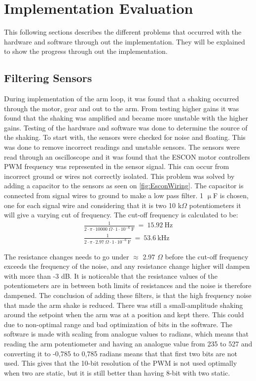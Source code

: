 \section{Implementation Evaluation}
This following sections describes the different problems that occurred with the hardware and software through out the implementation. They will be explained to show the progress through out the implementation.

\subsection{Filtering Sensors}
During implementation of the arm loop, it was found that a shaking occurred through the motor, gear and out to the arm. From testing higher gains it was found that the shaking was amplified and became more unstable with the higher gains. Testing of the hardware and software was done to determine the source of the shaking. To start with, the sensors were checked for noise and floating. This was done to remove incorrect readings and unstable sensors. The sensors were read through an oscilloscope and it was found that the ESCON motor controllers PWM frequency was represented in the sensor signal. This can occur from incorrect ground or wires not correctly isolated. This problem was solved by adding a capacitor to the sensors as seen on \autoref{fig:EsconWiring}. The capacitor is connected from signal wires to ground to make a low pass filter. 1 $\upmu$F is chosen, one for each signal wire and considering that it is two 10 k$\Omega$ potentiometers it will give a varying cut of frequency. The cut-off frequency is calculated to be:       
\begin{subequations}
\begin{flalign}
\frac{1}{2\cdot \pi \cdot 10000\ \Omega \cdot 1 \cdot 10^{-6}\  \text{F}}\ =\ 15.92\ \text{Hz} \\
\frac{1}{2\cdot \pi \cdot 2.97\ \Omega \cdot 1 \cdot 10^{-6}\  \text{F}}\ =\ 53.6\ \text{kHz}
\end{flalign}
\end{subequations}

The resistance changes needs to go under $\approx$ 2.97 $\Omega$ before the cut-off frequency exceeds the frequency of the noise, and any resistance change higher will dampen with more than -3 dB. It is noticeable that the resistance values of the potentiometers are in between both limits of resistances and the noise is therefore dampened. The conclusion of adding these filters, is that the high frequency noise that made the arm shake is reduced. There was still a small-amplitude shaking around the setpoint when the arm was at a position and kept there. This could due to non-optimal range and bad optimization of bits in the software. The software is made with scaling from analogue values to radians, which means that reading the arm potentiometer and having an analogue value from 235 to 527 and converting it to -0,785 to 0,785 radians means that that first two bits are not used. This gives that the 10-bit resolution of the PWM is not used optimally when two are static, but it is still better than having 8-bit with two static. 


